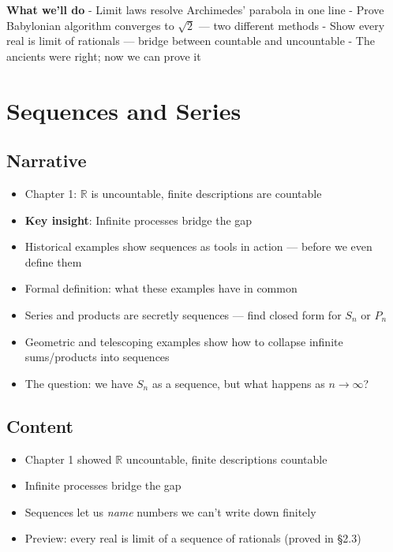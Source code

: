 \documentclass[
  10pt,
  letterpaper,
]{scrbook}
\providecommand{\tightlist}{%
  \setlength{\itemsep}{0pt}\setlength{\parskip}{0pt}}
\newcommand{\RR}{\mathbb{R}}
\begin{document}
\textbf{What we'll do} - Limit laws resolve Archimedes' parabola in one
line - Prove Babylonian algorithm converges to \(\sqrt{2}\) --- two
different methods - Show every real is limit of rationals --- bridge
between countable and uncountable - The ancients were right; now we can
prove it

\section{Sequences and Series}\label{sequences-and-series}

\subsection{Narrative}\label{narrative-5}

\begin{itemize}
\tightlist
\item
  Chapter 1: \(\RR\) is uncountable, finite descriptions are countable
\item
  \textbf{Key insight}: Infinite processes bridge the gap
\item
  Historical examples show sequences as tools in action --- before we
  even define them
\item
  Formal definition: what these examples have in common
\item
  Series and products are secretly sequences --- find closed form for
  \(S_n\) or \(P_n\)
\item
  Geometric and telescoping examples show how to collapse infinite
  sums/products into sequences
\item
  The question: we have \(S_n\) as a sequence, but what happens as
  \(n \to \infty\)?
\end{itemize}

\subsection{Content}\label{content-5}

\begin{itemize}
\tightlist
\item
  Chapter 1 showed \(\RR\) uncountable, finite descriptions countable
\item
  Infinite processes bridge the gap
\item
  Sequences let us \emph{name} numbers we can't write down finitely
\item
  Preview: every real is limit of a sequence of rationals (proved in
  §2.3)
\end{itemize}
\end{document}
